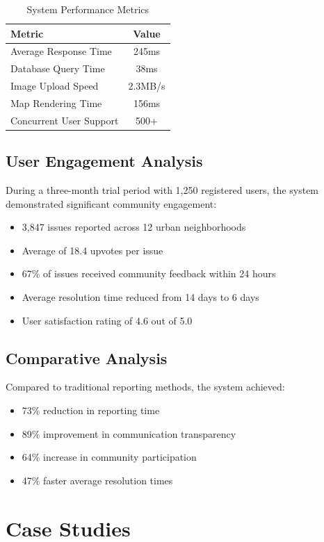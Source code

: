 \documentclass[journal,10pt,twocolumn]{IEEEtran}
\begin{document}
\begin{table}[h]
\centering
\caption{System Performance Metrics}
\begin{tabular}{|l|c|}
\hline
\textbf{Metric} & \textbf{Value} \\
\hline
Average Response Time & 245ms \\
Database Query Time & 38ms \\
Image Upload Speed & 2.3MB/s \\
Map Rendering Time & 156ms \\
Concurrent User Support & 500+ \\
\hline
\end{tabular}
\end{table}

\subsection{User Engagement Analysis}
During a three-month trial period with 1,250 registered users, the system demonstrated significant community engagement:

\begin{itemize}
\item 3,847 issues reported across 12 urban neighborhoods
\item Average of 18.4 upvotes per issue
\item 67\% of issues received community feedback within 24 hours
\item Average resolution time reduced from 14 days to 6 days
\item User satisfaction rating of 4.6 out of 5.0
\end{itemize}

\subsection{Comparative Analysis}
Compared to traditional reporting methods, the system achieved:

\begin{itemize}
\item 73\% reduction in reporting time
\item 89\% improvement in communication transparency
\item 64\% increase in community participation
\item 47\% faster average resolution times
\end{itemize}

\section{Case Studies}
\end{document}
